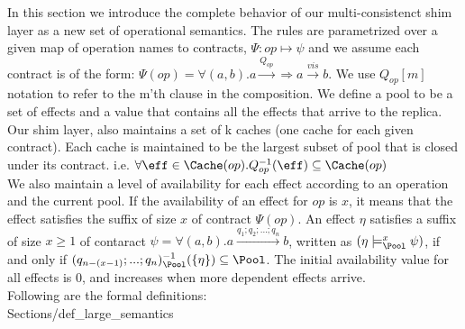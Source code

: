 In this section we introduce the complete behavior of our multi-consistenct shim layer as a new set of operational semantics. 
The rules are parametrized over a given map of operation names to
contracts, $\Psi :  op
\mapsto \psi $ and we assume each contract is of the form:
$\Psi(op)=\forall (a,b). a \xrightarrow{Q_{op}} \Rightarrow a \xrightarrow{vis} b.$ 
We use $Q_{op}[m]$ notation to refer to the m'th clause in the composition.
We define a pool to be a set of effects and a value that contains all
the effects that arrive to the replica. 
Our shim layer, also maintains a set of k caches (one cache for each
given contract). Each cache is maintained to be the largest
subset of pool that is closed under its
contract.  i.e. $\forall \eff \in \Cache(op). Q_{op}^{-1}(\eff)
\subseteq \Cache(op) $ 
\\We also maintain a level of availability for each effect
according to an operation and the current pool. If the availability of an effect for
$op$ is $x$, it means
that the effect satisfies the suffix of size $x$ of contract $\Psi(op)$.
An effect $\eta$ satisfies a suffix of size $x\geq 1$ of contaract
$\psi=\forall (a,b). a \xrightarrow{q_1;q_2;...;q_n} b$,
written as $ (\eta \models_{\Pool}^{x} \psi )$, if and only if
$(q_{n-(x-1)};...;q_{n} )^{-1}_{\Pool}(\{\eta\}) \subseteq \Pool$. The
initial availability value for all effects is 0, and increases when more
dependent effects arrive. 
\\
Following are the formal definitions: 
\\
 {Sections/def_large_semantics}



